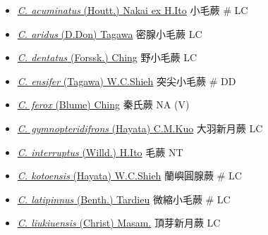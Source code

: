 \begin{itemize}
  \begin{itemize}
        \item[] \href{http://www.theplantlist.org/tpl1.1/search?q=Cyclosorus+acuminatus}{\textit{C. acuminatus} (Houtt.) Nakai ex H.Ito}   小毛蕨  \# LC
        \item[] \href{http://www.theplantlist.org/tpl1.1/search?q=Cyclosorus+aridus}{\textit{C. aridus} (D.Don) Tagawa}   密腺小毛蕨   LC
        \item[] \href{http://www.theplantlist.org/tpl1.1/search?q=Cyclosorus+dentatus}{\textit{C. dentatus} (Forssk.) Ching}   野小毛蕨   LC
        \item[] \href{http://www.theplantlist.org/tpl1.1/search?q=Cyclosorus+ensifer}{\textit{C. ensifer} (Tagawa) W.C.Shieh}   突尖小毛蕨  \# DD
        \item[] \href{http://www.theplantlist.org/tpl1.1/search?q=Cyclosorus+ferox}{\textit{C. ferox} (Blume) Ching}   秦氏蕨   NA (V)
        \item[] \href{http://www.theplantlist.org/tpl1.1/search?q=Cyclosorus+gymnopteridifrons}{\textit{C. gymnopteridifrons} (Hayata) C.M.Kuo}   大羽新月蕨   LC
        \item[] \href{http://www.theplantlist.org/tpl1.1/search?q=Cyclosorus+interruptus}{\textit{C. interruptus} (Willd.) H.Ito}   毛蕨   NT
        \item[] \href{http://www.theplantlist.org/tpl1.1/search?q=Cyclosorus+kotoensis}{\textit{C. kotoensis} (Hayata) W.C.Shieh}   蘭嶼圓腺蕨  \# LC
        \item[] \href{http://www.theplantlist.org/tpl1.1/search?q=Cyclosorus+latipinnus}{\textit{C. latipinnus} (Benth.) Tardieu}   微縮小毛蕨  \# LC
        \item[] \href{http://www.theplantlist.org/tpl1.1/search?q=Cyclosorus+liukiuensis}{\textit{C. liukiuensis} (Christ) Masam.}   頂芽新月蕨   LC

\end{itemize}
\end{itemize}
